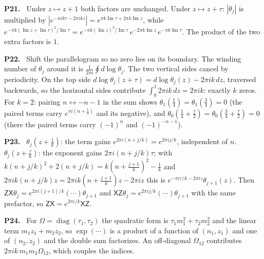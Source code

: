 \documentclass[11pt]{article}
\newenvironment{solution}[1]{\medskip\noindent\textbf{P#1.}\ }{\par\medskip}
\begin{document}
\begin{solution}{21}
Under $z\mapsto z+1$ both factors are unchanged. Under $z\mapsto z+\tau$:
$|\theta_j|$ is multiplied by $|e^{-\pi ik\tau-2\pi ikz}| = e^{\pi k\operatorname{Im}\tau+2\pi k\operatorname{Im}z}$,
while $e^{-\pi k(\operatorname{Im}z+\operatorname{Im}\tau)^2/\operatorname{Im}\tau}
= e^{-\pi k(\operatorname{Im}z)^2/\operatorname{Im}\tau}\,e^{-2\pi k\operatorname{Im}z}\,e^{-\pi k\operatorname{Im}\tau}$.
The product of the two extra factors is $1$.
\end{solution}

\begin{solution}{22}
Shift the parallelogram so no zero lies on its boundary. The winding number
of $\theta_j$ around it is $\frac{1}{2\pi i}\oint d\log\theta_j$. The two
vertical sides cancel by periodicity. On the top side $d\log\theta_j(z+\tau)
= d\log\theta_j(z) - 2\pi ik\,dz$, traversed backwards, so the horizontal
sides contribute $\int_0^1 2\pi ik\,dz = 2\pi ik$: exactly $k$ zeros. For $k=2$:
pairing $n\leftrightarrow -n-1$ in the sum shows $\theta_1(\tfrac14) = \theta_1(\tfrac34)=0$
(the paired terms carry $e^{\pi i(n+\frac12)}$ and its negative), and
$\theta_0(\tfrac14+\tfrac\tau2) = \theta_0(\tfrac34+\tfrac\tau2) = 0$ (there the paired
terms carry $(-1)^n$ and $(-1)^{-n-1}$).
\end{solution}

\begin{solution}{23}
$\theta_j(z+\tfrac1k)$: the term gains $e^{2\pi i(n+j/k)} = e^{2\pi ij/k}$, independent
of $n$. $\theta_j(z+\tfrac\tau k)$: the exponent gains $2\pi i(n+j/k)\tau$; with
$k(n+j/k)^2 + 2(n+j/k) = k(n+\tfrac{j+1}{k})^2 - \tfrac1k$ and
$2\pi ik(n+j/k)z = 2\pi ik(n+\tfrac{j+1}k)z - 2\pi iz$ this is
$e^{-\pi i\tau/k-2\pi iz}\theta_{j+1}(z)$. Then $\mathsf Z\mathsf X\theta_j
= e^{2\pi i(j+1)/k}(\cdots)\theta_{j+1}$ and $\mathsf X\mathsf Z\theta_j = e^{2\pi ij/k}(\cdots)\theta_{j+1}$
with the same prefactor, so $\mathsf Z\mathsf X = e^{2\pi i/k}\mathsf X\mathsf Z$.
\end{solution}

\begin{solution}{24}
For $\Omega = \operatorname{diag}(\tau_1,\tau_2)$ the quadratic form is
$\tau_1 m_1^2+\tau_2 m_2^2$ and the linear term $m_1z_1+m_2z_2$, so
$\exp(\cdots)$ is a product of a function of $(n_1,z_1)$ and one of $(n_2,z_2)$
and the double sum factorizes. An off-diagonal $\Omega_{12}$ contributes
$2\pi ik\,m_1m_2\Omega_{12}$, which couples the indices.
\end{solution}
\end{document}

